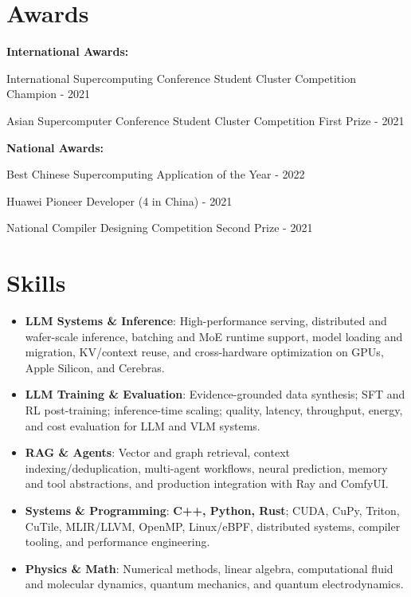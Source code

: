 \documentclass[a4paper,20pt]{article}
\newcommand{\resumeItem}[2]{
  \item\small{
    \textbf{#1}{: #2 \vspace{-2pt}}
  }
}
\newcommand{\resumeSubItem}[2]{\resumeItem{#1}{#2}\vspace{-3pt}}
\newcommand{\resumeSubHeadingListStart}{\begin{itemize}[leftmargin=*]}
\newcommand{\resumeSubHeadingListEnd}{\end{itemize}}
\begin{document}
\section{Awards}
\textbf{International Awards:}
\vspace{-8pt}
\begin{description}[font=$\bullet$]
\item {International Supercomputing Conference Student Cluster Competition Champion - 2021}
\vspace{-8pt}
\item {Asian Supercomputer Conference Student Cluster Competition First Prize - 2021}
\vspace{-8pt}
\end{description}
\textbf{National Awards:}
\vspace{-8pt}
\begin{description}[font=$\bullet$]
\item {Best Chinese Supercomputing Application of the Year - 2022}
\vspace{-8pt}
\item {Huawei Pioneer Developer (4 in China) - 2021}
\vspace{-8pt}
\item {National Compiler Designing Competition Second Prize - 2021}
\vspace{-8pt}
\end{description}


\section{Skills}

\resumeSubHeadingListStart
\resumeSubItem{LLM Systems \& Inference}{High-performance serving, distributed and wafer-scale inference, batching and MoE runtime support, model loading and migration, KV/context reuse, and cross-hardware optimization on GPUs, Apple Silicon, and Cerebras.}
\resumeSubItem{LLM Training \& Evaluation}{Evidence-grounded data synthesis; SFT and RL post-training; inference-time scaling; quality, latency, throughput, energy, and cost evaluation for LLM and VLM systems.}
\resumeSubItem{RAG \& Agents}{Vector and graph retrieval, context indexing/deduplication, multi-agent workflows, neural prediction, memory and tool abstractions, and production integration with Ray and ComfyUI.}
\resumeSubItem{Systems \& Programming}{\textbf{C++, Python, Rust}; CUDA, CuPy, Triton, CuTile, MLIR/LLVM, OpenMP, Linux/eBPF, distributed systems, compiler tooling, and performance engineering.}
\resumeSubItem{Physics \& Math}{Numerical methods, linear algebra, computational fluid and molecular dynamics, quantum mechanics, and quantum electrodynamics.}
\resumeSubHeadingListEnd
\end{document}
